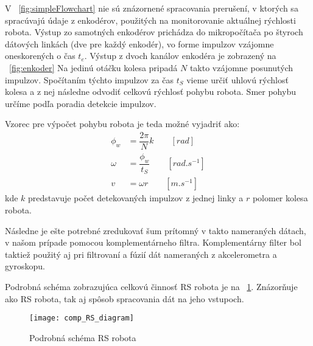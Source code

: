 V \figurename~\ref{fig:simpleFlowchart} nie sú znázornené spracovania prerušení, v ktorých sa spracúvajú údaje z enkodérov, použitých na monitorovanie aktuálnej rýchlosti robota. Výstup zo samotných enkodérov prichádza do mikropočítača po štyroch dátových linkách (dve pre každý enkodér), vo forme impulzov vzájomne oneskorených o čas $t_e$. Výstup z dvoch kanálov enkodéra je zobrazený na \figurename~\ref{fig:enkoder} Na jedinú otáčku kolesa pripadá $N$ takto vzájomne posunutých impulzov. Spočítaním týchto impulzov za čas  $t_S$ vieme určiť uhlovú rýchlosť kolesa a z nej následne odvodiť celkovú rýchlosť pohybu robota. Smer pohybu určíme podľa poradia detekcie impulzov.

Vzorec pre výpočet pohybu robota je teda možné vyjadriť ako:
\begin{align*}
\phi_w &= \dfrac{2\pi}{N}k \qquad [rad] \\
\omega &= \dfrac{\phi_w}{t_S} \qquad [rad.s^{-1}]\\
v &= \omega r \qquad[m.s^{-1}]
\end{align*}
kde $k$ predstavuje počet detekovaných impulzov z jednej linky a $r$ polomer kolesa robota.

Následne je ešte potrebné zredukovať šum prítomný v takto nameraných dátach, v našom prípade pomocou komplementárneho filtra. Komplementárny filter bol taktiež použitý aj pri filtrovaní a fúzií dát nameraných z akcelerometra a gyroskopu.  

Podrobná schéma zobrazujúca celkovú činnosť \ac{RS} robota je na \figurename~\ref{fig:podrobna_schema}. Znázorňuje ako RS robota, tak aj spôsob spracovania dát na jeho vstupoch.

\begin{figure}[b]
\centering
\texttt{[image: comp\_RS\_diagram]}
\caption{Podrobná schéma RS robota}
\label{fig:podrobna_schema}
\end{figure}



